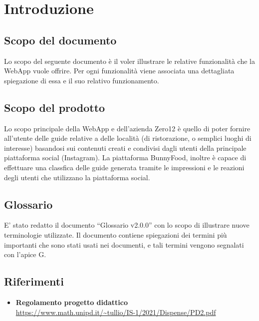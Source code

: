 \section{Introduzione}

\subsection{Scopo del documento}
Lo scopo del seguente documento è il voler illustrare
le relative funzionalità che la WebApp \platform{} vuole offrire.
Per ogni funzionalità viene associata una dettagliata spiegazione di essa e
il suo relativo funzionamento.

\subsection{Scopo del prodotto}
Lo scopo principale della WebApp \platform{} e dell'azienda Zero12 è quello di poter fornire all'utente delle guide
relative a delle località (di ristorazione, o semplici luoghi di interesse) basandosi sui contenuti creati e condivisi dagli utenti
della principale piattaforma social (Instagram). 
La piattaforma BunnyFood, inoltre è capace di effettuare una classfica delle guide generata tramite le impressioni e le reazioni degli utenti 
che utilizzano la piattaforma social.

\subsection{Glossario}
E' stato redatto il documento ``Glossario v2.0.0'' con lo scopo di illustrare nuove terminologie utilizzate.
Il documento contiene spiegazioni dei termini più importanti che sono stati usati nei documenti, e tali termini
vengono segnalati con l'apice G.

\subsection{Riferimenti}
\begin{itemize}
	\item
	{\textbf{Regolamento progetto didattico}}\\\url{https://www.math.unipd.it/~tullio/IS-1/2021/Dispense/PD2.pdf}

\end{itemize}
